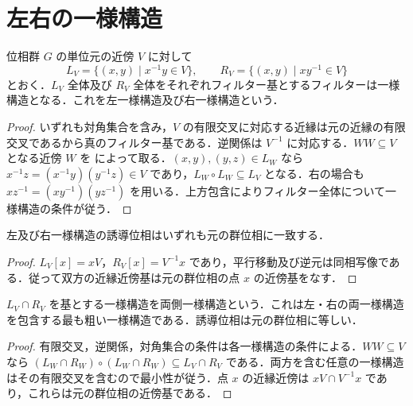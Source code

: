 \section{左右の一様構造}
\begin{prop}[左一様構造と右一様構造]
位相群 $G$ の単位元の近傍 $V$ に対して
\[
 L_V=\{(x,y)\mid x^{-1}y\in V\},\qquad
 R_V=\{(x,y)\mid xy^{-1}\in V\}
\]
とおく．$L_V$ 全体及び $R_V$ 全体をそれぞれフィルター基とするフィルターは一様構造となる．これを左一様構造及び右一様構造という．
\end{prop}
\begin{proof}
いずれも対角集合を含み，$V$ の有限交叉に対応する近縁は元の近縁の有限交叉であるから真のフィルター基である．逆関係は $V^{-1}$ に対応する．$WW\subseteq V$ となる近傍 $W$ を  によって取る．$(x,y),(y,z)\in L_W$ なら $x^{-1}z=(x^{-1}y)(y^{-1}z)\in V$ であり，$L_W\circ L_W\subseteq L_V$ となる．右の場合も $xz^{-1}=(xy^{-1})(yz^{-1})$ を用いる．上方包含によりフィルター全体について一様構造の条件が従う．
\end{proof}
\begin{prop}[左右一様構造の誘導位相]
左及び右一様構造の誘導位相はいずれも元の群位相に一致する．
\end{prop}
\begin{proof}
$L_V[x]=xV$，$R_V[x]=V^{-1}x$ であり，平行移動及び逆元は同相写像である．従って双方の近縁近傍基は元の群位相の点 $x$ の近傍基をなす．
\end{proof}
\begin{prop}[両側一様構造]
$L_V\cap R_V$ を基とする一様構造を両側一様構造という．これは左・右の両一様構造を包含する最も粗い一様構造である．誘導位相は元の群位相に等しい．
\end{prop}
\begin{proof}
有限交叉，逆関係，対角集合の条件は各一様構造の条件による．$WW\subseteq V$ なら $(L_W\cap R_W)\circ(L_W\cap R_W)\subseteq L_V\cap R_V$ である．両方を含む任意の一様構造はその有限交叉を含むので最小性が従う．点 $x$ の近縁近傍は $xV\cap V^{-1}x$ であり，これらは元の群位相の近傍基である．
\end{proof}
